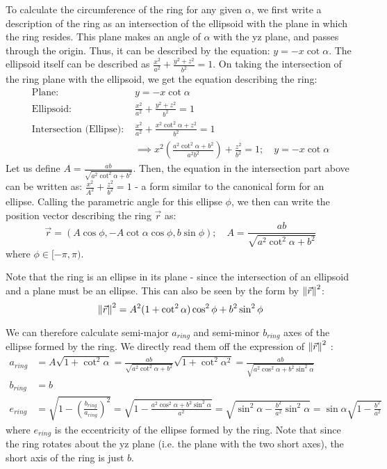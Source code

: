 To calculate the circumference of the ring for any given $\alpha$, we first write a description of the ring as an intersection of the ellipsoid with the plane in which the ring resides. This plane makes an angle of $\alpha$ with the yz plane, and passes through the origin. Thus, it can be described by the equation: $y = -x\cot\alpha$. The ellipsoid itself can be described as $\frac{x^2}{a^2} + \frac{y^2 + z^2}{b^2} = 1$. On taking the intersection of the ring plane with the ellipsoid, we get the equation describing the ring:
\begin{align*}
    \textrm{Plane: }&y = -x\cot\alpha \\
    \textrm{Ellipsoid: }&\frac{x^2}{a^2} + \frac{y^2 + z^2}{b^2} = 1 \\
    \textrm{Intersection (Ellipse): }&\frac{x^2}{a^2} + \frac{x^2\cot^2\alpha + z^2}{b^2} = 1\\
    &\implies x^2\left(\frac{a^2\cot^2\alpha + b^2}{a^2b^2}\right) + \frac{z^2}{b^2} = 1; \quad y = -x\cot\alpha
\end{align*}
Let us define $A = \frac{ab}{\sqrt{a^2\cot^2\alpha + b^2}}$. Then, the equation in the intersection part above can be written as: $\frac{x^2}{A^2} + \frac{z^2}{b^2} = 1$ - a form similar to the canonical form for an ellipse. Calling the parametric angle for this ellipse $\phi$, we then can write the position vector describing the ring $\Vec{r}$ as:
\begin{equation*}
    \Vec{r} = \left(A\cos\phi,-A\cot\alpha\cos\phi,b\sin\phi\right); \quad A = \frac{ab}{\sqrt{a^2\cot^2\alpha + b^2}}
\end{equation*}
where $\phi \in [-\pi,\pi)$.

Note that the ring is an ellipse in its plane - since the intersection of an ellipsoid and a plane must be an ellipse. This can also be seen by the form by $\norm{\Vec{r}}^2$:
\begin{equation*}
    \norm{\Vec{r}}^2 = A^2(1 + \cot^2\alpha)\cos^2\phi + b^2\sin^2\phi
\end{equation*}

We can therefore calculate semi-major $a_{ring}$ and semi-minor $b_{ring}$ axes of the ellipse formed by the ring. We directly read them off the expression of $\norm{\Vec{r}}^2$ :
\begin{align*}
    a_{ring} &= A\sqrt{1 + \cot^2\alpha} = \frac{ab}{\sqrt{a^2\cot^2\alpha + b^2}}\sqrt{1 + \cot^2\alpha^2} = \frac{ab}{\sqrt{a^2\cos^2\alpha + b^2\sin^2\alpha}}\\
    b_{ring} &= b \\
    e_{ring} &= \sqrt{1 - \left(\frac{b_{ring}}{a_{ring}}\right)^2} = \sqrt{1 - \frac{a^2\cos^2\alpha + b^2\sin^2\alpha}{a^2}} = \sqrt{\sin^2\alpha - \frac{b^2}{a^2}\sin^2\alpha} = \sin\alpha\sqrt{1 - \frac{b^2}{a^2}}
\end{align*}
where $e_{ring}$ is the eccentricity of the ellipse formed by the ring. Note that since the ring rotates about the yz plane (i.e. the plane with the two short axes), the short axis of the ring is just $b$.

